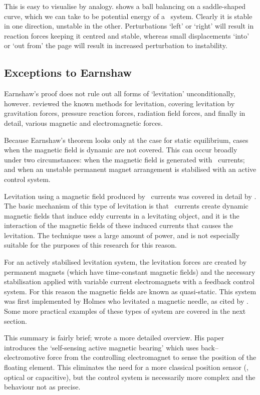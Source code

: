 This is easy to visualise by analogy.  shows a ball balancing
on a saddle-shaped curve, which we can take to be potential energy of a \twoD\
system. Clearly it is stable in one direction, unstable in the other.
Perturbations `left' or `right' will result in reaction forces keeping it
centred and stable, whereas small displacements `into' or `out from' the page
will result in increased perturbation to instability.

\subsection{Exceptions to Earnshaw}

Earnshaw's proof does not rule out all forms of `levitation' unconditionally,
however. \textcite{boerdijk1956a} reviewed the known methods for levitation,
covering levitation by gravitation forces, pressure reaction forces, radiation
field forces, and finally in detail, various magnetic and electromagnetic
forces.

Because Earnshaw's theorem looks only at the case for static equilibrium,
cases when the magnetic field is dynamic are not covered. This can occur
broadly under two circumstances: when the magnetic field is generated with
\AC\ currents; and when an unstable permanent magnet arrangement is stabilised
with an active control system.

Levitation using a magnetic field produced by \AC\ currents was covered in
detail by \textcite{laithwaite1965}. The basic mechanism of this type of
levitation is that \AC\ currents create dynamic magnetic fields that induce
eddy currents in a levitating object, and it is the interaction of the
magnetic fields of these induced currents that causes the levitation. The
technique uses a large amount of power, and is not especially suitable for the
purposes of this research for this reason.

For an actively stabilised levitation system, the levitation forces are
created by permanent magnets (which have time-constant magnetic fields) and
the necessary stabilisation applied with variable current electromagnets with
a feedback control system. For this reason the magnetic fields are known as
quasi-static. This system was first implemented by Holmes who levitated a
magnetic needle, as cited by \textcite{boerdijk1956a}. Some more practical
examples of these types of system are covered in the next section.

This summary is fairly brief; \textcite{bleuler1992} wrote a more detailed
overview. His paper introduces the `self-sensing active magnetic bearing'
\cite{vischer1993} which uses back--electromotive force from the controlling
electromagnet to sense the position of the floating element. This eliminates
the need for a more classical position sensor (\eg, optical or capacitive),
but the control system is necessarily more complex and the behaviour not as
precise.

